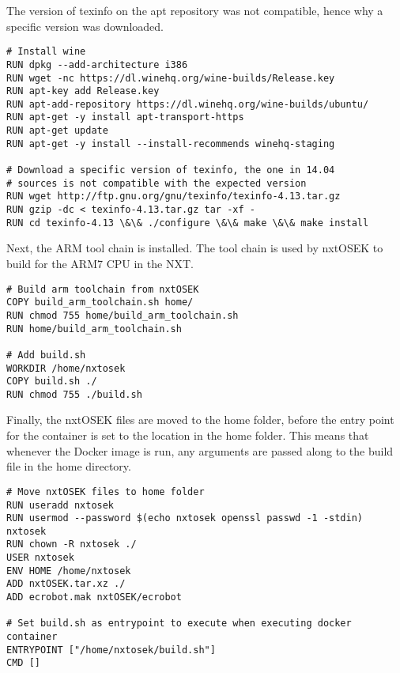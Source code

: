 The version of texinfo on the apt repository was not compatible, hence why a specific version was downloaded.

\begin{lstlisting}[language=docker,label={lst:dockerimplementation2},caption={Installation of Wine and texinfo},firstnumber=6]
# Install wine
RUN dpkg --add-architecture i386
RUN wget -nc https://dl.winehq.org/wine-builds/Release.key
RUN apt-key add Release.key
RUN apt-add-repository https://dl.winehq.org/wine-builds/ubuntu/
RUN apt-get -y install apt-transport-https
RUN apt-get update
RUN apt-get -y install --install-recommends winehq-staging

# Download a specific version of texinfo, the one in 14.04
# sources is not compatible with the expected version
RUN wget http://ftp.gnu.org/gnu/texinfo/texinfo-4.13.tar.gz
RUN gzip -dc < texinfo-4.13.tar.gz tar -xf -
RUN cd texinfo-4.13 \&\& ./configure \&\& make \&\& make install
\end{lstlisting}
Next, the ARM tool chain is installed.
The tool chain is used by nxtOSEK to build for the ARM7 CPU in the NXT.
\begin{lstlisting}[language=docker,label={lst:dockerimplementation3},caption={Building the ARM toolchain},firstnumber=20]
# Build arm toolchain from nxtOSEK
COPY build_arm_toolchain.sh home/
RUN chmod 755 home/build_arm_toolchain.sh
RUN home/build_arm_toolchain.sh

# Add build.sh
WORKDIR /home/nxtosek
COPY build.sh ./
RUN chmod 755 ./build.sh
\end{lstlisting}

Finally, the nxtOSEK files are moved to the home folder, before the entry point for the container is set to the location in the home folder.
This means that whenever the Docker image is run, any arguments are passed along to the build file in the home directory.

\begin{lstlisting}[language=docker,label={lst:dockerimplementation4},caption={Moving the nxtOSEK files and setting the entry point},firstnumber=29]
# Move nxtOSEK files to home folder
RUN useradd nxtosek
RUN usermod --password $(echo nxtosek openssl passwd -1 -stdin) nxtosek
RUN chown -R nxtosek ./
USER nxtosek
ENV HOME /home/nxtosek
ADD nxtOSEK.tar.xz ./
ADD ecrobot.mak nxtOSEK/ecrobot

# Set build.sh as entrypoint to execute when executing docker container
ENTRYPOINT ["/home/nxtosek/build.sh"]
CMD []
\end{lstlisting}


